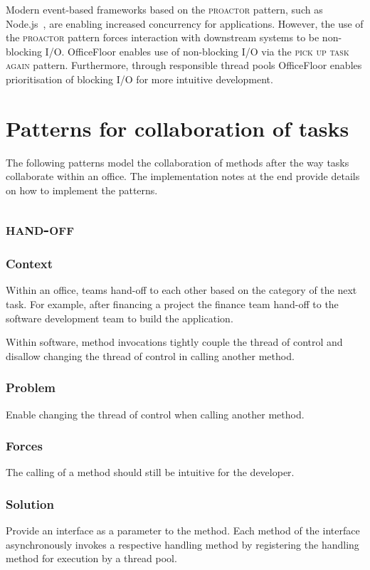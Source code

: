 \documentclass[prodmode]{style/acmlarge}
\begin{document}
Modern event-based frameworks based on the \textsc{proactor} pattern, such as
Node.js~\cite{nodejs}, are enabling increased concurrency for applications.
However, the use of the \textsc{proactor} pattern forces interaction with
downstream systems to be non-blocking I/O.  OfficeFloor enables use of
non-blocking I/O via the \textsc{pick up task again} pattern.  Furthermore,
through responsible thread pools OfficeFloor enables prioritisation of blocking
I/O for more intuitive development.


\section{Patterns for collaboration of tasks}

The following patterns model the collaboration of methods after the way tasks
collaborate within an office.  The implementation notes at the end provide
details on how to implement the patterns.


\subsection{\textsc{\textbf{hand-off}}}

\subsubsection*{Context} Within an office, teams hand-off to each other based on
the category of the next task.  For example, after financing a project the
finance team hand-off to the software development team to build the application.

Within software, method invocations tightly couple the thread of control and
disallow changing the thread of control in calling another method.

\subsubsection*{\textbf{Problem}} Enable changing the thread of control when calling
another method.

\subsubsection*{Forces} The calling of a method should still be intuitive for
the developer.

\subsubsection*{\textbf{Solution}}  Provide an interface as a parameter to the
method.  Each method of the interface asynchronously invokes a respective
handling method by registering the handling method for execution by a thread
pool.
\end{document}
